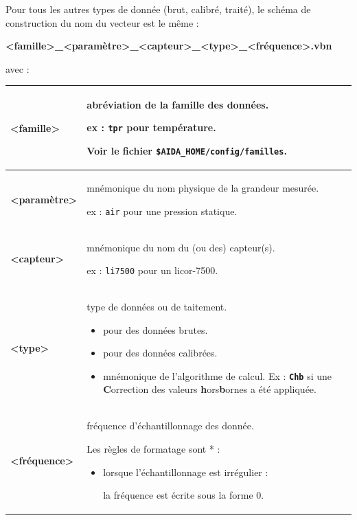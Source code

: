 Pour tous les autres types de donnée (brut, calibré, traité), le schéma
de construction du nom du vecteur est le même : \\

\begin{center}
  \textbf{<famille>\_<paramètre>\_<capteur>\_<type>\_<fréquence>.vbn}
\end{center}

avec :

\begin{center}
\begin{tabular}{|p{3cm}|p{11cm}|}
\hline

\textbf{<famille>} &
abréviation de la famille des données.

ex : \texttt{tpr} pour température.

Voir le fichier \texttt{\$AIDA\_HOME/config/familles}.
\\ \hline

\textbf{<paramètre>} &
mnémonique du nom physique de la grandeur mesurée.

ex : \texttt{air} pour une pression statique.
\\ \hline

\textbf{<capteur>} &
mnémonique du nom du (ou des) capteur(s).

ex : \texttt{li7500} pour un licor-7500.
\\ \hline

\textbf{<type>} &
type de données ou de taitement.

\begin{itemize}
  \item[\texttt{raw}] pour des données brutes.
  \item[\texttt{cal}] pour des données calibrées.
  \item[\texttt{xxx}] mnémonique de l’algorithme de calcul. 
                      Ex : \texttt{\textbf{Chb}} si une \textbf{C}orrection
                      des valeurs \textbf{h}ors\-\textbf{b}ornes a été appliquée.
\end{itemize}
\\ \hline

\textbf{<fréquence>} &
fréquence d’échantillonnage des donnée.

Les règles de formatage sont * :
\begin{itemize}
  \item[•] lorsque l’échantillonnage est irrégulier :

           la fréquence est écrite sous la forme 0.


\end{itemize}
\end{tabular}
\end{center}
